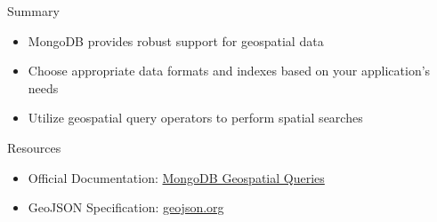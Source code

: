 \documentclass[aspectratio=169]{beamer}
\begin{document}

\begin{frame}{Summary}
  \begin{itemize}
    \item MongoDB provides robust support for geospatial data
    \item Choose appropriate data formats and indexes based on your application's needs
    \item Utilize geospatial query operators to perform spatial searches
  \end{itemize}
\end{frame}

\begin{frame}{Resources}
  \begin{itemize}
    \item Official Documentation: \href{https://www.mongodb.com/docs/manual/geospatial-queries/}{MongoDB Geospatial Queries}
    \item GeoJSON Specification: \href{https://geojson.org/}{geojson.org}
  \end{itemize}
\end{frame}
\end{document}
